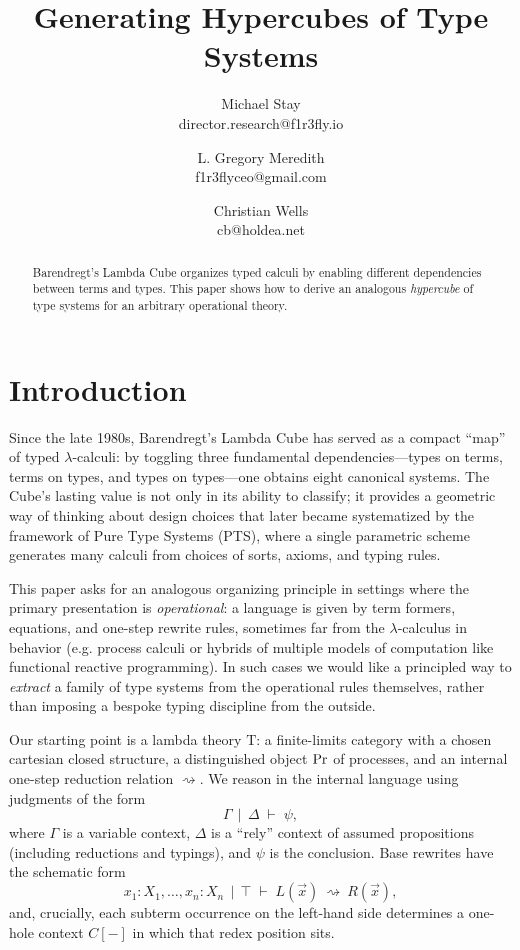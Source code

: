 \documentclass[11pt]{article}
\title{Generating Hypercubes of Type Systems}
\author{Michael Stay\\director.research@f1r3fly.io \and L. Gregory Meredith \\f1r3flyceo@gmail.com \and Christian Wells \\cb@holdea.net}
\date{}
\theoremstyle{definition}
\theoremstyle{plain}
\theoremstyle{remark}
\theoremstyle{plain}
\renewcommand{\Pr}{{\rm Pr}}
\newcommand{\rsq}{\rightsquigarrow}
\newcommand{\ctx}{\,|\,}
\newcommand{\mrm}[1]{\mathrm{#1}}
\newcommand{\T}{\mrm{T}}
\begin{document}
\maketitle

\begin{abstract}
Barendregt’s Lambda Cube organizes typed calculi by enabling different dependencies between terms and types.  This paper shows how to derive an analogous \emph{hypercube} of type systems for an arbitrary operational theory.
\end{abstract}

\section{Introduction}
Since the late 1980s, Barendregt’s Lambda Cube\cite{Barendregt1991} has served as a compact “map” of typed $\lambda$-calculi: by toggling three fundamental dependencies—types on terms, terms on types, and types on types—one obtains eight canonical systems.  The Cube’s lasting value is not only in its ability to classify; it provides a geometric way of thinking about design choices that later became systematized by the framework of Pure Type Systems (PTS), where a single parametric scheme generates many calculi from choices of sorts, axioms, and typing rules.

This paper asks for an analogous organizing principle in settings where the primary presentation is \emph{operational}: a language is given by term formers, equations, and one-step rewrite rules, sometimes far from the $\lambda$-calculus in behavior (e.g. process calculi or hybrids of multiple models of computation like functional reactive programming).  In such cases we would like a principled way to \emph{extract} a family of type systems from the operational rules themselves, rather than imposing a bespoke typing discipline from the outside.

Our starting point is a lambda theory $\T$: a finite-limits category with a chosen cartesian closed structure, a distinguished object $\Pr$ of processes, and an internal one-step reduction relation $\rsq$.  We reason in the internal language using judgments of the form
\[
  \Gamma \;\ctx\; \Delta \;\vdash\; \psi,
\]
where $\Gamma$ is a variable context, $\Delta$ is a “rely” context of assumed propositions (including reductions and typings), and $\psi$ is the conclusion.  Base rewrites have the schematic form
\[
  x_1:X_1,\dots,x_n:X_n \;\ctx\; \top \;\vdash\; L(\vec x)\ \rsq\ R(\vec x),
\]
and, crucially, each subterm occurrence on the left-hand side determines a one-hole context $C[-]$ in which that redex position sits.
\end{document}
